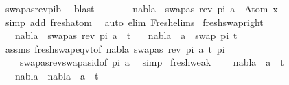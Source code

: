 \begin{isabellebody}
\ swapas{\isacharunderscore}{\kern0pt}rev{\isacharunderscore}{\kern0pt}pi{\isacharunderscore}{\kern0pt}b\ \isamarkupfalse%
\ blast\ \ \isanewline
\ \ \isamarkupfalse%
\ \isamarkupfalse%
\ {\isachardoublequoteopen}nabla\ {\isasymturnstile}\ swapas\ {\isacharparenleft}{\kern0pt}rev\ pi{\isacharparenright}{\kern0pt}\ a\ {\isasymsharp}\ Atom\ x{\isachardoublequoteclose}\isanewline
\ \ \ \ \isamarkupfalse%
\ {\isacharparenleft}{\kern0pt}simp\ add{\isacharcolon}{\kern0pt}\ fresh{\isacharunderscore}{\kern0pt}atom{\isacharparenright}{\kern0pt}\ \isanewline
{}\isamarkupfalse%
\ {\isacharparenleft}{\kern0pt}auto\ elim{\isacharcolon}{\kern0pt}\ Fresh{\isacharunderscore}{\kern0pt}elims{\isacharparenright}{\kern0pt}%
\endisatagproof
{\isafoldproof}%
%
\isadelimproof
\isanewline
%
\endisadelimproof
\isanewline
\isanewline
\isanewline
{}\isamarkupfalse%
\ fresh{\isacharunderscore}{\kern0pt}swap{\isacharunderscore}{\kern0pt}right{\isacharcolon}{\kern0pt}\ \isanewline
\ \ \ {\isachardoublequoteopen}nabla\ {\isasymturnstile}\ swapas\ {\isacharparenleft}{\kern0pt}rev\ pi{\isacharparenright}{\kern0pt}\ a\ {\isasymsharp}\ t{\isachardoublequoteclose}\isanewline
\ \ \ {\isachardoublequoteopen}nabla\ {\isasymturnstile}\ a\ {\isasymsharp}\ swap\ pi\ t{\isachardoublequoteclose}\isanewline
%
\isadelimproof
\ \ %
\endisadelimproof
%
\isatagproof
{}\isamarkupfalse%
\ assms\ fresh{\isacharunderscore}{\kern0pt}swap{\isacharunderscore}{\kern0pt}eqvt{\isacharbrackleft}{\kern0pt}of\ nabla\ {\isacartoucheopen}swapas\ {\isacharparenleft}{\kern0pt}rev\ pi{\isacharparenright}{\kern0pt}\ a{\isacartoucheclose}\ t\ pi{\isacharbrackright}{\kern0pt}\ \isanewline
\ \ \ \ swapas{\isacharunderscore}{\kern0pt}rev{\isacharunderscore}{\kern0pt}swapas{\isacharunderscore}{\kern0pt}id{\isacharbrackleft}{\kern0pt}of\ pi\ a{\isacharbrackright}{\kern0pt}\ \isamarkupfalse%
\ simp%
\endisatagproof
{\isafoldproof}%
%
\isadelimproof
\isanewline
%
\endisadelimproof
\isanewline
{}\isamarkupfalse%
\ fresh{\isacharunderscore}{\kern0pt}weak{\isacharcolon}{\kern0pt}\ \isanewline
\ \ \ {\isachardoublequoteopen}nabla{}\ {\isasymturnstile}\ a\ {\isasymsharp}\ t{\isachardoublequoteclose}\isanewline
\ \ \ {\isachardoublequoteopen}{\isacharparenleft}{\kern0pt}nabla{}\ {\isasymunion}\ nabla{}{\isacharparenright}{\kern0pt}\ {\isasymturnstile}\ a\ {\isasymsharp}\ t{\isachardoublequoteclose}\isanewline

\end{isabellebody}
